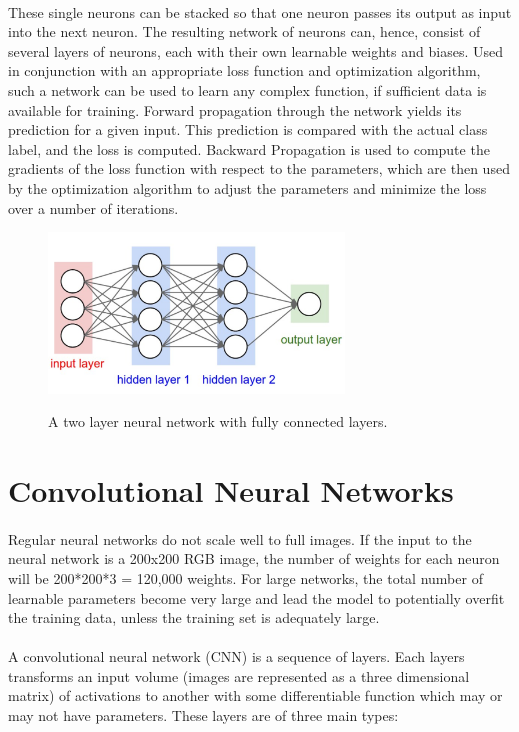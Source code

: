 \documentclass[12pt, a4paper]{report}
\begin{document}
\paragraph{}
These single neurons can be stacked so that one neuron passes its output as input into the next neuron. The resulting network of neurons can, hence, consist of several layers of neurons, each with their own learnable weights and biases. Used in conjunction with an appropriate loss function and optimization algorithm, such a network can be used to learn any complex function, if sufficient data is available for training. Forward propagation through the network yields its prediction for a given input. This prediction is compared with the actual class label, and the loss is computed. Backward Propagation is used to compute the gradients of the loss function with respect to the parameters, which are then used by the optimization algorithm to adjust the parameters and minimize the loss over a number of iterations.
\begin{figure}[h]
\centering
\includegraphics[width=0.7\textwidth]{nn2.png}
\caption{A two layer neural network with fully connected layers.}\cite{cs231n}
\end{figure}
\newpage

\section{Convolutional Neural Networks}
\paragraph{}
Regular neural networks do not scale well to full images. If the input to the neural network is a 200x200 RGB image, the number of weights for each neuron will be 200*200*3 = 120,000 weights. For large networks, the total number of learnable parameters become very large and lead the model to potentially overfit the training data, unless the training set is adequately large.
\paragraph{}
A convolutional neural network (CNN) is a sequence of layers. Each layers transforms an input volume (images are represented as a three dimensional matrix) of activations to another with some differentiable function which may or may not have parameters.\cite{cs231n, dlai4} These layers are of three main types:
\end{document}
